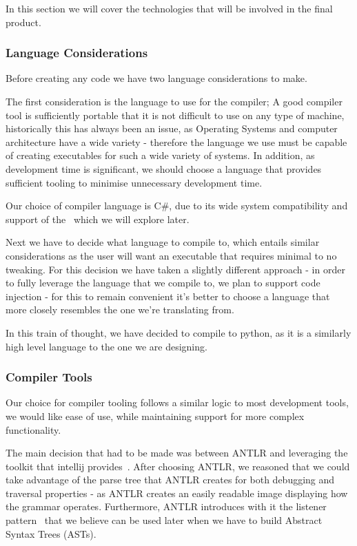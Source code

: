 In this section we will cover the technologies that will be involved in the final product.

\subsubsection{Language Considerations}
Before creating any code we have two language considerations to make.

The first consideration is the language to use for the compiler;
A good compiler tool is sufficiently portable that it is not difficult to use on any type of machine, historically this
has always been an issue, as Operating Systems and computer architecture have a wide variety - therefore the language
we use must be capable of creating executables for such a wide variety of systems.
In addition, as development time is significant, we should choose a language that provides sufficient tooling to
minimise unnecessary development time.

Our choice of compiler language is C#, due to its wide system compatibility and support of the~\cite{ANTLR} which we
will explore later.

Next we have to decide what language to compile to, which entails similar considerations as the user will want an
executable that requires minimal to no tweaking.
For this decision we have taken a slightly different approach - in order to fully leverage the language that we compile
to, we plan to support code injection - for this to remain convenient it's better to choose a language that more closely
resembles the one we're translating from.

In this train of thought, we have decided to compile to python, as it is a similarly high level language to the one
we are designing.

\subsubsection{Compiler Tools}
Our choice for compiler tooling follows a similar logic to most development tools, we would like ease of use, while
maintaining support for more complex functionality.

The main decision that had to be made was between ANTLR and leveraging the toolkit that intellij
provides~\cite{IntellijLanguage}.
After choosing ANTLR, we reasoned that we could take advantage of the parse tree that ANTLR creates for both debugging
and traversal properties - as ANTLR creates an easily readable image displaying how the grammar operates.
Furthermore, ANTLR introduces with it the listener pattern~\cite[p18]{ANTLRReference} that we believe can be used later
when we have to build Abstract Syntax Trees (ASTs).

